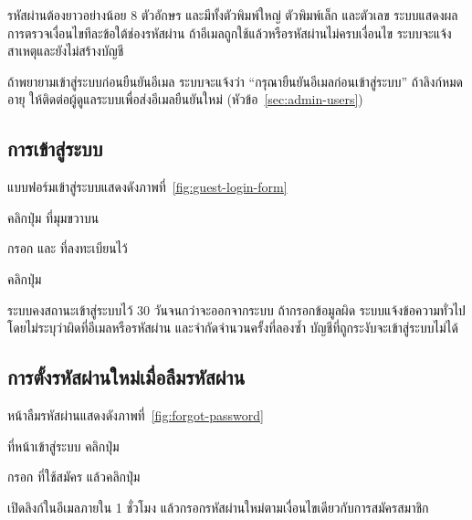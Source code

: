 \begin{important}
รหัสผ่านต้องยาวอย่างน้อย 8 ตัวอักษร และมีทั้งตัวพิมพ์ใหญ่ ตัวพิมพ์เล็ก และตัวเลข ระบบแสดงผลการตรวจเงื่อนไขทีละข้อใต้ช่องรหัสผ่าน ถ้าอีเมลถูกใช้แล้วหรือรหัสผ่านไม่ครบเงื่อนไข ระบบจะแจ้งสาเหตุและยังไม่สร้างบัญชี
\end{important}

ถ้าพยายามเข้าสู่ระบบก่อนยืนยันอีเมล ระบบจะแจ้งว่า ``กรุณายืนยันอีเมลก่อนเข้าสู่ระบบ'' ถ้าลิงก์หมดอายุ ให้ติดต่อผู้ดูแลระบบเพื่อส่งอีเมลยืนยันใหม่ (หัวข้อ~\ref{sec:admin-users})

\subsection{การเข้าสู่ระบบ}
\label{sec:login}

แบบฟอร์มเข้าสู่ระบบแสดงดังภาพที่~\ref{fig:guest-login-form}


\begin{steps}
  \item คลิกปุ่ม  ที่มุมขวาบน
  \item กรอก  และ  ที่ลงทะเบียนไว้
  \item คลิกปุ่ม 
\end{steps}

\begin{note}
ระบบคงสถานะเข้าสู่ระบบไว้ 30 วันจนกว่าจะออกจากระบบ ถ้ากรอกข้อมูลผิด ระบบแจ้งข้อความทั่วไปโดยไม่ระบุว่าผิดที่อีเมลหรือรหัสผ่าน และจำกัดจำนวนครั้งที่ลองซ้ำ บัญชีที่ถูกระงับจะเข้าสู่ระบบไม่ได้
\end{note}

\subsection{การตั้งรหัสผ่านใหม่เมื่อลืมรหัสผ่าน}
\label{sec:forgot-password}

หน้าลืมรหัสผ่านแสดงดังภาพที่~\ref{fig:forgot-password}


\begin{steps}
  \item ที่หน้าเข้าสู่ระบบ คลิกปุ่ม 
  \item กรอก  ที่ใช้สมัคร แล้วคลิกปุ่ม 
  \item เปิดลิงก์ในอีเมลภายใน 1 ชั่วโมง แล้วกรอกรหัสผ่านใหม่ตามเงื่อนไขเดียวกับการสมัครสมาชิก
\end{steps}

